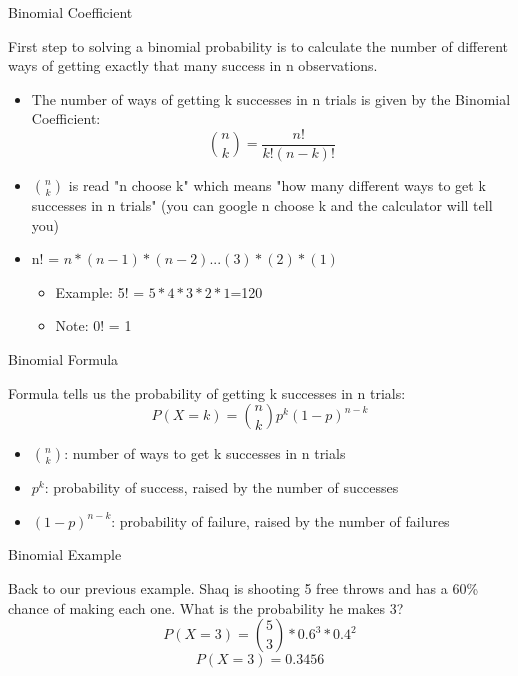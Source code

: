 \documentclass{beamer}
\begin{document}
\begin{frame}{Binomial Coefficient}
	
	First step to solving a binomial probability is to calculate the number of different ways of getting exactly that many success in n observations.
	\begin{itemize} 
		\item The number of ways of getting k successes in n trials is given by the \alert{Binomial Coefficient}: \[ 
			{n \choose k}= \frac{n!}{k!(n-k)!}
		\]
	
		\item ${n \choose k}$ is read "n choose k" which means "how many different ways to get k successes in n trials" (you can google n choose k and the calculator will tell you)
		
		\item n! = $n*(n-1)*(n-2)...(3)*(2)*(1)$
		      \begin{itemize}
		      	\item Example: 5! = $5*4*3*2*1$=120
		      	\item Note: 0! = 1
		      \end{itemize}
	\end{itemize}
	
\end{frame}

\begin{frame}{Binomial Formula}
	
	Formula tells us the probability of getting k successes in n trials:
	$$P(X=k) = {n \choose k} p^k (1-p)^{n-k}$$
	\begin{itemize}
		\item ${n \choose k}$: number of ways to get k successes in n trials
		\item $p^k$: probability of success, raised by the number of successes
		\item $(1-p)^{n-k}$: probability of failure, raised by the number of failures
	\end{itemize}
	
\end{frame}

\begin{frame}{Binomial Example}
	
	Back to our previous example. Shaq is shooting 5 free throws and has a 60\% chance of making each one. What is the probability he makes 3?
	$$P(X=3) = {5 \choose 3}*0.6^3*0.4^2$$
	$$P(X=3) = 0.3456$$
	
\end{frame}
\end{document}
